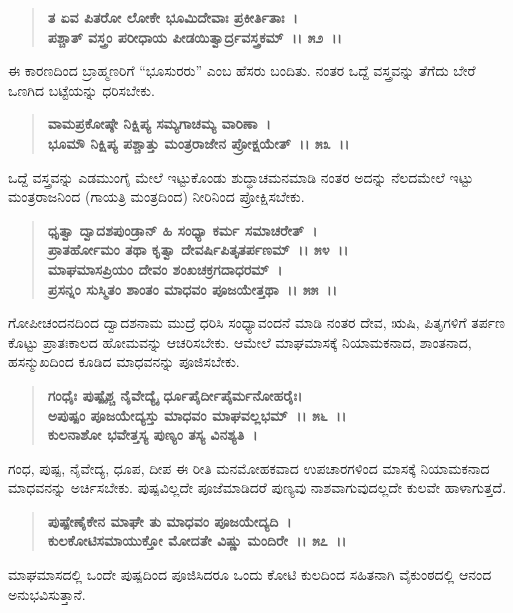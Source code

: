 \begin{verse}
\textbf{ತ ಏವ ಪಿತರೋ ಲೋಕೇ ಭೂಮಿದೇವಾಃ ಪ್ರಕೀರ್ತಿತಾಃ~।}\\\textbf{ಪಶ್ಚಾತ್ ವಸ್ತ್ರಂ ಪರೀಧಾಯ ಪೀಡಯಿತ್ವಾರ್ದ್ರವಸ್ತ್ರಕಮ್~।। ೫೨~।।}
\end{verse}

ಈ ಕಾರಣದಿಂದ ಬ್ರಾಹ್ಮಣರಿಗೆ “ಭೂಸುರರು” ಎಂಬ ಹೆಸರು ಬಂದಿತು. ನಂತರ ಒದ್ದೆ ವಸ್ತ್ರವನ್ನು ತೆಗೆದು ಬೇರೆ ಒಣಗಿದ ಬಟ್ಟೆಯನ್ನು ಧರಿಸಬೇಕು.

\begin{verse}
\textbf{ವಾಮಪ್ರಕೋಷ್ಠೇ ನಿಕ್ಷಿಪ್ಯ ಸಮ್ಯಗಾಚಮ್ಯ ವಾರಿಣಾ~।}\\\textbf{ಭೂಮೌ ನಿಕ್ಷಿಪ್ಯ ಪಶ್ಚಾತ್ತು ಮಂತ್ರರಾಜೇನ ಪ್ರೋಕ್ಷಯೇತ್~।। ೫೩~।।}
\end{verse}

ಒದ್ದೆ ವಸ್ತ್ರವನ್ನು ಎಡಮುಂಗೈ ಮೇಲೆ ಇಟ್ಟುಕೊಂಡು ಶುದ್ಧಾಚಮನಮಾಡಿ ನಂತರ ಅದನ್ನು ನೆಲದಮೇಲೆ ಇಟ್ಟು ಮಂತ್ರರಾಜನಿಂದ (ಗಾಯತ್ರಿ ಮಂತ್ರದಿಂದ) ನೀರಿನಿಂದ ಪ್ರೋಕ್ಷಿಸಬೇಕು.

\begin{verse}
\textbf{ಧೃತ್ವಾ ದ್ವಾದಶಪುಂಡ್ರಾನ್ ಹಿ ಸಂಧ್ಯಾ ಕರ್ಮ ಸಮಾಚರೇತ್~।}\\\textbf{ಪ್ರಾತರ್ಹೋಮಂ ತಥಾ ಕೃತ್ವಾ ದೇವರ್ಷಿಪಿತೃತರ್ಪಣಮ್~।। ೫೪~।।}\\\textbf{ಮಾಘಮಾಸಪ್ರಿಯಂ ದೇವಂ ಶಂಖಚಕ್ರಗದಾಧರಮ್~।\\ ಪ್ರಸನ್ನಂ ಸುಸ್ಮಿತಂ ಶಾಂತಂ ಮಾಧವಂ ಪೂಜಯೇತ್ತಥಾ~।। ೫೫~।।}
\end{verse}

ಗೋಪೀಚಂದನದಿಂದ ದ್ವಾದಶನಾಮ ಮುದ್ರೆ ಧರಿಸಿ ಸಂಧ್ಯಾವಂದನೆ ಮಾಡಿ ನಂತರ ದೇವ, ಋಷಿ, ಪಿತೃಗಳಿಗೆ ತರ್ಪಣ ಕೊಟ್ಟು ಪ್ರಾತಃಕಾಲದ ಹೋಮವನ್ನು ಆಚರಿಸಬೇಕು. ಆಮೇಲೆ ಮಾಘಮಾಸಕ್ಕೆ ನಿಯಾಮಕನಾದ, ಶಾಂತನಾದ, ಹಸನ್ಮುಖದಿಂದ ಕೂಡಿದ ಮಾಧವನನ್ನು ಪೂಜಿಸಬೇಕು.

\begin{verse}
\textbf{ಗಂಧೈಃ ಪುಷ್ಪೈಶ್ಚ ನೈವೇದ್ಯೈ ರ್ಧೂಪೈರ್ದೀಪೈರ್ಮನೋಹರೈಃ।}\\\textbf{ಅಪುಷ್ಪಂ ಪೂಜಯೇದ್ಯಸ್ತು ಮಾಧವಂ ಮಾಘವಲ್ಲಭಮ್~।। ೫೬~।।}\\\textbf{ಕುಲನಾಶೋ ಭವೇತ್ತಸ್ಯ ಪುಣ್ಯಂ ತಸ್ಯ ವಿನಶ್ಯತಿ~।}
\end{verse}

ಗಂಧ, ಪುಷ್ಪ, ನೈವೇದ್ಯ, ಧೂಪ, ದೀಪ ಈ ರೀತಿ ಮನಮೋಹಕವಾದ ಉಪಚಾರಗಳಿಂದ ಮಾಸಕ್ಕೆ ನಿಯಾಮಕನಾದ ಮಾಧವನನ್ನು ಅರ್ಚಿಸಬೇಕು. ಪುಷ್ಪವಿಲ್ಲದೇ ಪೂಜೆಮಾಡಿದರೆ ಪುಣ್ಯವು ನಾಶವಾಗುವುದಲ್ಲದೇ ಕುಲವೇ ಹಾಳಾಗುತ್ತದೆ.

\begin{verse}
\textbf{ಪುಷ್ಪೇಣೈಕೇನ ಮಾಘೇ ತು ಮಾಧವಂ ಪೂಜಯೇದ್ಯದಿ~।}\\\textbf{ಕುಲಕೋಟಿಸಮಾಯುಕ್ತೋ ಮೋದತೇ ವಿಷ್ಣು ಮಂದಿರೇ~।। ೫೭~।।}
\end{verse}

ಮಾಘಮಾಸದಲ್ಲಿ ಒಂದೇ ಪುಷ್ಪದಿಂದ ಪೂಜಿಸಿದರೂ ಒಂದು ಕೋಟಿ ಕುಲದಿಂದ ಸಹಿತನಾಗಿ ವೈಕುಂಠದಲ್ಲಿ ಆನಂದ ಅನುಭವಿಸುತ್ತಾನೆ.

